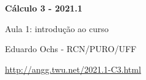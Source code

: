 \documentclass[oneside,12pt]{article}
\begin{document}


\long{}
\long{}
\long{}
\long{}
\long{}
\long{}
\long{}
\long{}
\long{}
\long{}
\long{}

\long{}
\long{}

\def\frown{\ensuremath{{=}{(}}}
\def\True {\mathbf{V}}
\def\False{\mathbf{F}}
\def\D    {\displaystyle}

\def\drafturl{http://angg.twu.net/LATEX/2021-1-C3.pdf}
\def\drafturl{http://angg.twu.net/2021.1-C3.html}
\def\draftfooter{\tiny \href{\drafturl}{\jobname{}} \ColorBrown{\shorttoday{} \hours}}



%

\thispagestyle{empty}

\begin{center}

\vspace*{1.2cm}

{\bf \Large Cálculo 3 - 2021.1}

\bsk

Aula 1: introdução ao curso

\bsk

Eduardo Ochs - RCN/PURO/UFF

\url{http://angg.twu.net/2021.1-C3.html}

\end{center}
\end{document}
